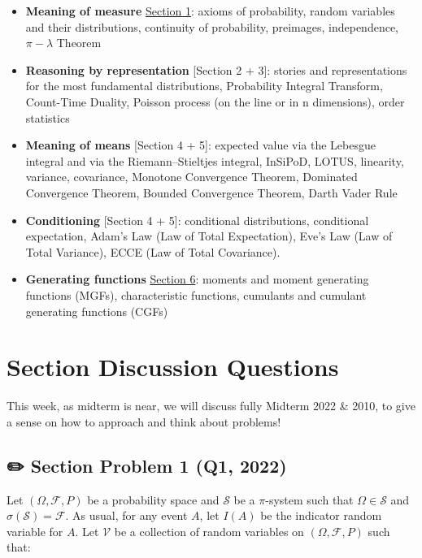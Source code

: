 \documentclass[
  letterpaper,
  DIV=11,
  numbers=noendperiod]{scrreprt}
\theoremstyle{plain}
\theoremstyle{definition}
\theoremstyle{remark}
\begin{document}
\begin{itemize}
\item
  \textbf{Meaning of measure} \protect\hyperlink{section-1}{Section 1}:
  axioms of probability, random variables and their distributions,
  continuity of probability, preimages, independence, \(\pi-\lambda\)
  Theorem
\item
  \textbf{Reasoning by representation} {[}Section 2 + 3{]}: stories and
  representations for the most fundamental distributions, Probability
  Integral Transform, Count-Time Duality, Poisson process (on the line
  or in n dimensions), order statistics
\item
  \textbf{Meaning of means} {[}Section 4 + 5{]}: expected value via the
  Lebesgue integral and via the Riemann--Stieltjes integral, InSiPoD,
  LOTUS, linearity, variance, covariance, Monotone Convergence Theorem,
  Dominated Convergence Theorem, Bounded Convergence Theorem, Darth
  Vader Rule
\item
  \textbf{Conditioning} {[}Section 4 + 5{]}: conditional distributions,
  conditional expectation, Adam's Law (Law of Total Expectation), Eve's
  Law (Law of Total Variance), ECCE (Law of Total Covariance).
\item
  \textbf{Generating functions} \protect\hyperlink{section-6}{Section
  6}: moments and moment generating functions (MGFs), characteristic
  functions, cumulants and cumulant generating functions (CGFs)
\end{itemize}

\hypertarget{section-discussion-questions-4}{%
\section*{Section Discussion
Questions}\label{section-discussion-questions-4}}


This week, as midterm is near, we will discuss fully Midterm 2022 \&
2010, to give a sense on how to approach and think about problems!

\hypertarget{section-problem-1-q1-2022}{%
\subsection*{✏️ Section Problem 1 (Q1,
2022)}\label{section-problem-1-q1-2022}}

Let \((\Omega, \mathcal{F}, P)\) be a probability space and
\(\mathcal{S}\) be a \(\pi\)-system such that \(\Omega \in \mathcal{S}\)
and \(\sigma(\mathcal{S})=\mathcal{F}\). As usual, for any event \(A\),
let \(I(A)\) be the indicator random variable for \(A\). Let
\(\mathcal{V}\) be a collection of random variables on
\((\Omega, \mathcal{F}, P)\) such that:
\end{document}
